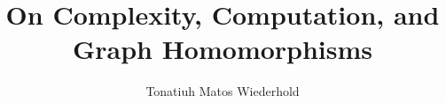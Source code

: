 \documentclass{ut-thesis-local}
\author{Tonatiuh Matos Wiederhold}
\title{On Complexity, Computation, and Graph Homomorphisms}
\begin{document}
\frontmatter
\maketitle





\tableofcontents
\listoftables
\listoffigures

\mainmatter








\backmatter

\nocite{*}


\end{document}
